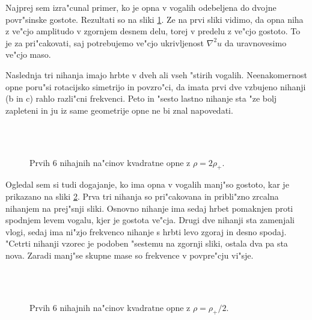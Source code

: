 \documentclass[a4paper,10pt]{article}
\begin{document}
Najprej sem izra"cunal primer, ko je opna v vogalih odebeljena do dvojne povr"sinske gostote. Rezultati so na sliki \ref{fig:kvadrat-2}. Ze na prvi sliki vidimo, da opna niha z ve"cjo amplitudo v zgornjem desnem delu, torej v predelu z ve"cjo gostoto. To je za pri"cakovati, saj potrebujemo ve"cjo ukrivljenost $\nabla^2 u$ da uravnovesimo ve"cjo maso. 

Naslednja tri nihanja imajo hrbte v dveh ali vseh "stirih vogalih. Neenakomernost opne poru"si rotacijsko simetrijo in povzro"ci, da imata prvi dve vzbujeno nihanji (b in c) rahlo razli"cni frekvenci. Peto in "sesto lastno nihanje sta "ze bolj zapleteni in ju iz same geometrije opne ne bi znal napovedati. 

\begin{figure}[H]
\centering
   \\
   \\
\caption{Prvih 6 nihajnih na"cinov kvadratne opne z $\rho = 2\rho_+$. }
\label{fig:kvadrat-2}
\end{figure}

Ogledal sem si tudi dogajanje, ko ima opna v vogalih manj"so gostoto, kar je prikazano na sliki \ref{fig:kvadrat-05}. Prva tri nihanja so pri"cakovana in pribli"zno zrcalna nihanjem na prej"snji sliki. Osnovno nihanje ima sedaj hrbet pomaknjen proti spodnjem levem vogalu, kjer je gostota ve"cja. Drugi dve nihanji sta zamenjali vlogi, sedaj ima ni"zjo frekvenco nihanje s hrbti levo zgoraj in desno spodaj. "Cetrti nihanji vzorec je podoben "sestemu na zgornji sliki, ostala dva pa sta nova. Zaradi manj"se skupne mase so frekvence v povpre"cju vi"sje. 

\begin{figure}[H]
\centering
   \\
   \\
\caption{Prvih 6 nihajnih na"cinov kvadratne opne z $\rho = \rho_+/2$. }
\label{fig:kvadrat-05}
\end{figure}
\end{document}
